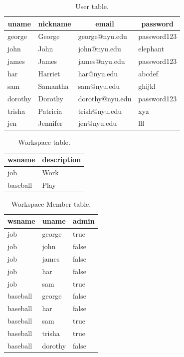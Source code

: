 \documentclass{article}
\begin{document}
\begin{table}[!p]
\centering
\begin{tabular}{l l l l}
\toprule
\multicolumn{1}{c}{uname} &
\multicolumn{1}{c}{nickname} &
\multicolumn{1}{c}{email} &
\multicolumn{1}{c}{password} \\
\midrule
george  & George    & george@nyu.edu  & password123     \\
john    & John      & john@nyu.edu    & elephant        \\
james   & James     & james@nyu.edu   & password123     \\
har     & Harriet   & har@nyu.edu     & abcdef          \\
sam     & Samantha  & sam@nyu.edu     & ghijkl          \\
dorothy & Dorothy   & dorothy@nyu.edu & password123     \\
trisha  & Patricia  & trish@nyu.edu   & xyz             \\
jen     & Jennifer  & jen@nyu.edu     & lll             \\
\bottomrule
\end{tabular}
\caption{User table.}
\label{tbl:user}
\end{table}

\begin{table}[!p]
\centering
\begin{tabular}{l l}
\toprule
\multicolumn{1}{c}{wsname} &
\multicolumn{1}{c}{description} \\
\midrule
job & Work \\
baseball & Play \\
\bottomrule
\end{tabular}
\caption{Workspace table.}
\label{tbl:ws}
\end{table}

\begin{table}[!p]
\centering
\begin{tabular}{l l l}
\toprule
\multicolumn{1}{c}{wsname} &
\multicolumn{1}{c}{uname} &
\multicolumn{1}{c}{admin} \\
\midrule
job & george  & true   \\
job & john    & false  \\
job & james   & false  \\
job & har     & false  \\
job & sam     & true   \\
\midrule
baseball & george & false \\
baseball & har & false \\
baseball & sam & true \\
baseball & trisha  & true \\
baseball & dorothy & false \\
\bottomrule
\end{tabular}
\caption{Workspace Member table.}
\label{tbl:wsmember}
\end{table}
\end{document}
